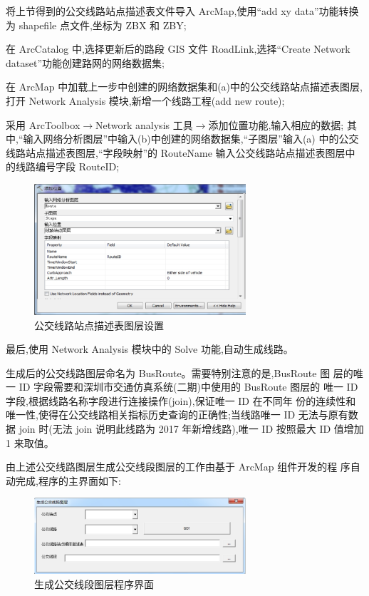 \begin{nbeae}
\item 将上节得到的公交线路站点描述表文件导入 ArcMap,使用“add
xy data”功能转换为 shapefile 点文件,坐标为 ZBX 和 ZBY;
\item 在 ArcCatalog 中,选择更新后的路段 GIS 文件 RoadLink,选择“Create Network
dataset”功能创建路网的网络数据集;
\item 在 ArcMap 中加载上一步中创建的网络数据集和(a)中的公交线路站点描述表图层,
打开 Network Analysis 模块,新增一个线路工程(add new route);
\item 采用 ArcToolbox$\rightarrow$Network analysis 工具$\rightarrow$添加位置功能,输入相应的数据;
其中,“输入网络分析图层”中输入(b)中创建的网络数据集,“子图层”输入(a)
中的公交线路站点描述表图层,“字段映射”的 RouteName 输入公交线路站点描述表图层中的线路编号字段 RouteID;
\begin{figure}[!htbp]
  \centering
  \includegraphics[width=0.7\textwidth]{figures/chp02_公交线路站点描述表图层设置.jpg}
  \caption{公交线路站点描述表图层设置\label{fig:公交线路站点描述表图层设置} }
\end{figure}
\item 最后,使用 Network Analysis 模块中的 Solve 功能,自动生成线路。
\end{nbeae}

生成后的公交线路图层命名为 BusRoute。需要特别注意的是,BusRoute 图
层的唯一 ID 字段需要和深圳市交通仿真系统(二期)中使用的 BusRoute 图层的
唯一 ID 字段,根据线路名称字段进行连接操作(join),保证唯一 ID 在不同年
份的连续性和唯一性,使得在公交线路相关指标历史查询的正确性;当线路唯一
ID 无法与原有数据 join 时(无法 join 说明此线路为 2017 年新增线路),唯一 ID
按照最大 ID 值增加 1 来取值。

由上述公交线路图层生成公交线段图层的工作由基于 ArcMap 组件开发的程
序自动完成,程序的主界面如下:
\begin{figure}[!htbp]
  \centering
  \includegraphics[width=0.7\textwidth]{figures/chp02_生成公交线段图层程序界面.jpg}
  \caption{生成公交线段图层程序界面\label{fig:生成公交线段图层程序界面} }
\end{figure}

